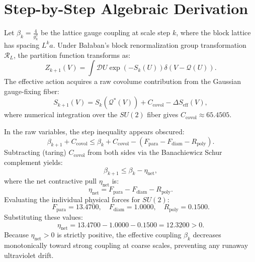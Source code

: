 \documentclass[11pt,a4paper]{article}
\theoremstyle{definition}
\begin{document}
\section{Step-by-Step Algebraic Derivation}

Let $\beta_k = \frac{4}{g_k^2}$ be the lattice gauge coupling at scale step $k$, where the block lattice has spacing $L^k a$. Under Bałaban's block renormalization group transformation $\mathcal{R}_L$, the partition function transforms as:
\begin{equation}
Z_{k+1}(V) = \int \mathcal{D} U \exp\left( - S_k(U) \right) \delta\left( V - \mathcal{Q}(U) \right).
\end{equation}
The effective action acquires a raw covolume contribution from the Gaussian gauge-fixing fiber:
\begin{equation}
S_{k+1}(V) = S_k(\mathcal{Q}^*(V)) + C_{\mathrm{covol}} - \Delta S_{\mathrm{eff}}(V),
\end{equation}
where numerical integration over the $SU(2)$ fiber gives $C_{\mathrm{covol}} \approx 65.4505$. 

In the raw variables, the step inequality appears obscured:
\begin{equation}
\beta_{k+1} + C_{\mathrm{covol}} \le \beta_k + C_{\mathrm{covol}} - (F_{\mathrm{para}} - F_{\mathrm{diam}} - R_{\mathrm{poly}}).
\end{equation}
Subtracting (taring) $C_{\mathrm{covol}}$ from both sides via the Banachiewicz Schur complement yields:
\begin{equation}
\beta_{k+1} \le \beta_k - \eta_{\mathrm{net}},
\end{equation}
where the net contractive pull $\eta_{\mathrm{net}}$ is:
\begin{equation}
\eta_{\mathrm{net}} = F_{\mathrm{para}} - F_{\mathrm{diam}} - R_{\mathrm{poly}}.
\end{equation}
Evaluating the individual physical forces for $SU(2)$:
\begin{equation}
F_{\mathrm{para}} = 13.4700, \quad F_{\mathrm{diam}} = 1.0000, \quad R_{\mathrm{poly}} = 0.1500.
\end{equation}
Substituting these values:
\begin{equation}
\eta_{\mathrm{net}} = 13.4700 - 1.0000 - 0.1500 = 12.3200 > 0.
\end{equation}
Because $\eta_{\mathrm{net}} > 0$ is strictly positive, the effective coupling $\beta_k$ decreases monotonically toward strong coupling at coarse scales, preventing any runaway ultraviolet drift.
\end{document}
